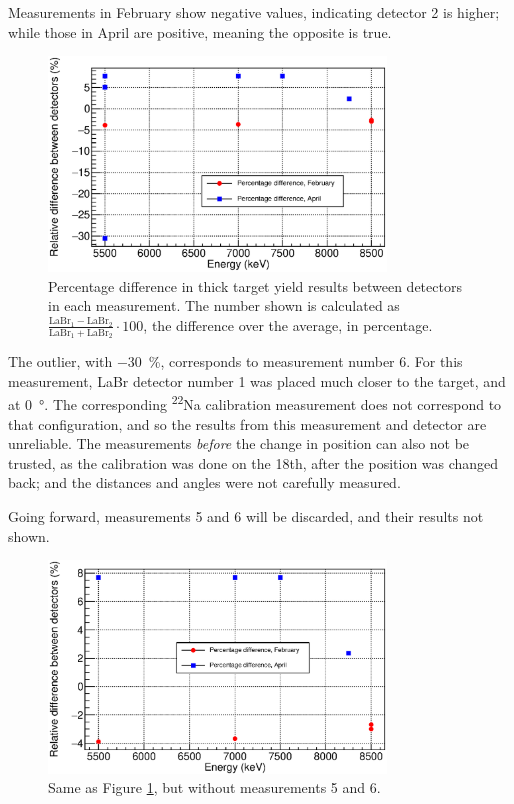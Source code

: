 \documentclass[a4paper,12pt]{report}
\newcommand{\Na}{\textsuperscript{22}Na }
\begin{document}
Measurements in February show negative values, indicating detector 2 is higher; while those in April are positive, meaning the opposite is true.

\begin{figure}[H]
	\centering
	\includegraphics[width=0.80\textwidth]{decay_errors_rel_per.eps}
	\caption{Percentage difference in thick target yield results between detectors in each measurement.
	The number shown is calculated as $\frac{\text{LaBr}_1-\text{LaBr}_2}{\text{LaBr}_1+\text{LaBr}_2}\cdot 100$, the difference over the average, in percentage.}
	\label{decay_errors_rel_per}
\end{figure}

The outlier, with \qty{-30}{\percent}, corresponds to measurement number 6.
For this measurement, LaBr detector number 1 was placed much closer to the target, and at \qty{0}{\degree}.
The corresponding \Na calibration measurement does not correspond to that configuration, and so the results from this measurement and detector are unreliable.
The measurements \emph{before} the change in position can also not be trusted, as the calibration was done on the 18th, after the position was changed back; and the distances and angles were not carefully measured.

Going forward, measurements 5 and 6 will be discarded, and their results not shown.
\\

\begin{figure}[H]
	\centering
	\includegraphics[width=0.80\textwidth]{decay_errors_rel_per_fixed.eps}
	\caption{Same as Figure \ref{decay_errors_rel_per}, but without measurements 5 and 6.}
	\label{decay_errors_rel_per_fixed}
\end{figure}
\end{document}
